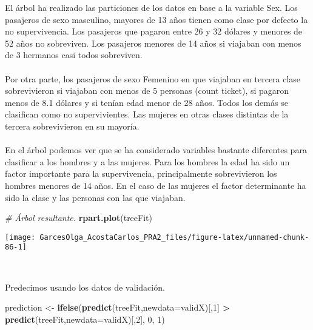 \documentclass[
]{article}
\newenvironment{Shaded}{\begin{snugshade}}{\end{snugshade}}
\newcommand{\CommentTok}[1]{\textcolor[rgb]{0.56,0.35,0.01}{\textit{#1}}}
\newcommand{\DataTypeTok}[1]{\textcolor[rgb]{0.13,0.29,0.53}{#1}}
\newcommand{\DecValTok}[1]{\textcolor[rgb]{0.00,0.00,0.81}{#1}}
\newcommand{\KeywordTok}[1]{\textcolor[rgb]{0.13,0.29,0.53}{\textbf{#1}}}
\newcommand{\NormalTok}[1]{#1}
\newcommand{\OperatorTok}[1]{\textcolor[rgb]{0.81,0.36,0.00}{\textbf{#1}}}
\newcommand{\StringTok}[1]{\textcolor[rgb]{0.31,0.60,0.02}{#1}}
\begin{document}
El árbol ha realizado las particiones de los datos en base a la variable
Sex. Los pasajeros de sexo masculino, mayores de 13 años tienen como
clase por defecto la no supervivencia. Los pasajeros que pagaron entre
26 y 32 dólares y menores de 52 años no sobreviven. Los pasajeros
menores de 14 años si viajaban con menos de 3 hermanos casi todos
sobreviven.\\
\texttt{}~\\
Por otra parte, los pasajeros de sexo Femenino en que viajaban en
tercera clase sobrevivieron si viajaban con menos de 5 personas (count
ticket), si pagaron menos de 8.1 dólares y si tenían edad menor de 28
años. Todos los demás se clasifican como no supervivientes. Las mujeres
en otras clases distintas de la tercera sobrevivieron en su mayoría.\\
\texttt{}~\\
En el árbol podemos ver que se ha considerado variables bastante
diferentes para clasificar a los hombres y a las mujeres. Para los
hombres la edad ha sido un factor importante para la supervivencia,
principalmente sobrevivieron los hombres menores de 14 años. En el caso
de las mujeres el factor determinante ha sido la clase y las personas
con las que viajaban.\\
\texttt{}

\begin{Shaded}
\begin{Highlighting}[]
\CommentTok{# Árbol resultante.  }
\KeywordTok{rpart.plot}\NormalTok{(treeFit)}
\end{Highlighting}
\end{Shaded}

\begin{center}\texttt{[image: GarcesOlga\_AcostaCarlos\_PRA2\_files/figure-latex/unnamed-chunk-86-1]} \end{center}

\texttt{}~\\
\texttt{}

Predecimos usando los datos de validación.

\begin{Shaded}
\begin{Highlighting}[]
\NormalTok{prediction <-}\StringTok{ }\KeywordTok{ifelse}\NormalTok{(}\KeywordTok{predict}\NormalTok{(treeFit,}\DataTypeTok{newdata=}\NormalTok{validX)[,}\DecValTok{1}\NormalTok{] }\OperatorTok{>}\StringTok{ }\KeywordTok{predict}\NormalTok{(treeFit,}\DataTypeTok{newdata=}\NormalTok{validX)[,}\DecValTok{2}\NormalTok{], }\DecValTok{0}\NormalTok{, }\DecValTok{1}\NormalTok{)}
\end{Highlighting}
\end{Shaded}
\end{document}
